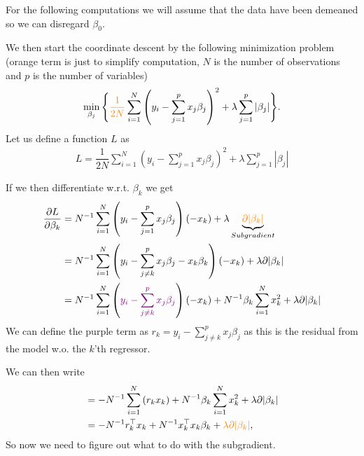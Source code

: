 \documentclass[aspectratio=169,10pt]{beamer}
\begin{document}
\begin{frame}{\secname}{\subsecname}
  For the following computations we will assume that the data have been demeaned so we can disregard $\beta_0$.

  We then start the coordinate descent by the following minimization problem ({\color{orange}orange} term is just to simplify computation, $N$ is the number of observations and $p$ is the number of variables)
  \begin{align}
    \min_{\beta_j} \Bigg\{ {\color{orange}\dfrac{1}{2N}} \sum_{i=1}^N \left( y_i - \sum_{j=1}^p x_j \beta_j\right)^2 + \lambda \sum_{j=1}^p |\beta_j| \Bigg\}.
  \end{align}
  Let us define a function $L$ as
  \begin{align}
    L = \dfrac{1}{2N} \sum_{i=1}^N \left( y_i - \sum_{j=1}^p x_j \beta_j\right)^2 + \lambda \sum_{j=1}^p |\beta_j|
  \end{align}
\end{frame}

\begin{frame}{\secname}{\subsecname}
  If we then differentiate w.r.t.\! $\beta_k$ we get
  \begin{align}
    \frac{\partial L}{\partial \beta_k} &= N^{-1} \sum_{i=1}^N \left( y_i - \sum_{j=1}^p x_j \beta_j\right)\left(-x_k\right) + \lambda \underbrace{{\color{orange}\partial|\beta_k|}}_{Subgradient} \\
    &= N^{-1} \sum_{i=1}^N \left( y_i - \sum_{j\neq k}^p x_j \beta_j - x_k \beta_k\right)\left(-x_k\right) + \lambda \partial|\beta_k| \\
    &= N^{-1} \sum_{i=1}^N \left( {\color{violet}y_i - \sum_{j\neq k}^p x_j \beta_j}\right)\left(-x_k\right) + N^{-1}\beta_k\sum_{i=1}^N x_k^2 + \lambda \partial|\beta_k|
  \end{align}
  We can define the purple term as $r_k = y_i - \sum_{j\neq k}^p x_j \beta_j$ as this is the residual from the model w.o. the $k$'th regressor.
\end{frame}

\begin{frame}{\secname}{\subsecname}
  We can then write
  \begin{align}
    &=-N^{-1} \sum_{i=1}^N \left( r_k x_k\right) + N^{-1}\beta_k\sum_{i=1}^N x_k^2 + \lambda \partial|\beta_k| \\
    &=-N^{-1} r_k^\top x_k + N^{-1} x_k^\top x_k\beta_k + {\color{orange}\lambda \partial|\beta_k|},
  \end{align}
  So now we need to figure out what to do with the {\color{orange} subgradient}.
\end{frame}
\end{document}
